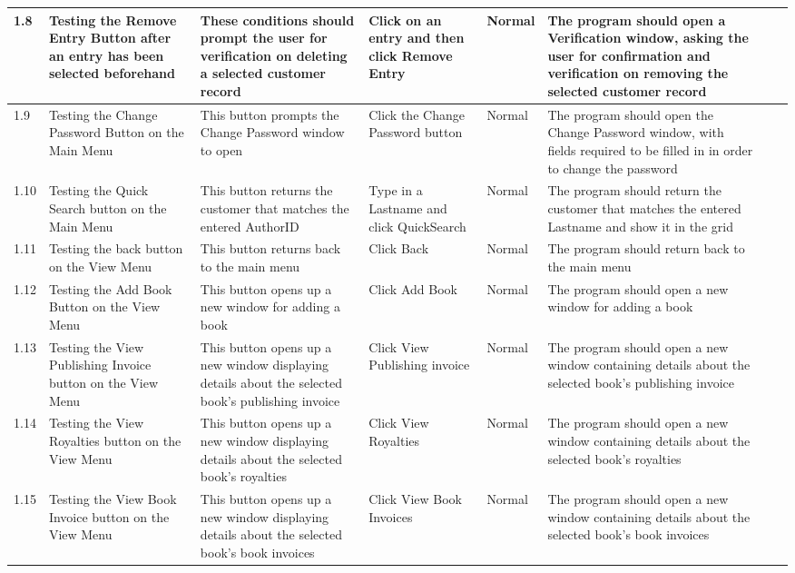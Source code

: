 \begin{landscape}
\begin{center}
\begin{longtable}{|p{1.5cm}|p{2cm}|p{2.5cm}|p{2.5cm}|p{2cm}|p{2cm}|p{2cm}|p{2cm}|}
        1.8 & Testing the Remove Entry Button after an entry has been selected beforehand & These conditions should prompt the user for verification on deleting a selected customer record & Click on an entry and then click Remove Entry & Normal & The program should open a Verification window, asking the user for confirmation and verification on removing the selected customer record & & \\ \hline
        1.9 & Testing the Change Password Button on the Main Menu & This button prompts the Change Password window to open & Click the Change Password button & Normal & The program should open the Change Password window, with fields required to be filled in in order to change the password & & \\ \hline
        1.10 & Testing the Quick Search button on the Main Menu & This button returns the customer that matches the entered AuthorID & Type in a Lastname and click QuickSearch & Normal & The program should return the customer that matches the entered Lastname and show it in the grid & & \\ \hline
        1.11 & Testing the back button on the View Menu & This button returns back to the main menu & Click Back & Normal & The program should return back to the main menu & & \\ \hline
        1.12 & Testing the Add Book Button on the View Menu & This button opens up a new window for adding a book & Click Add Book & Normal & The program should open a new window for adding a book & & \\ \hline
        1.13 & Testing the View Publishing Invoice button on the View Menu & This button opens up a new window displaying details about the selected book's publishing invoice & Click View Publishing invoice & Normal & The program should open a new window containing details about the selected book's publishing invoice & & \\ \hline
        1.14 & Testing the View Royalties button on the View Menu & This button opens up a new window displaying details about the selected book's royalties & Click View Royalties & Normal & The program should open a new window containing details about the selected book's royalties & & \\ \hline
        1.15 & Testing the View Book Invoice button on the View Menu & This button opens up a new window displaying details about the selected book's book invoices & Click View Book Invoices & Normal & The program should open a new window containing details about the selected book's book invoices & & \\ \hline

\end{longtable}
\end{center}
\end{landscape}
